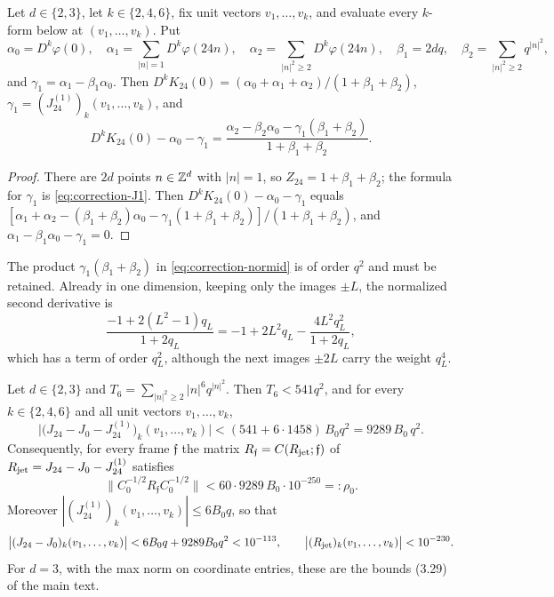 \begin{lemma}\label{lem:correction-normalization}
Let $d\in\{2,3\}$, let $k\in\{2,4,6\}$, fix unit vectors $v_1,\dots,v_k$, and evaluate every $k$-form below at $(v_1,\dots,v_k)$. Put
\[
\alpha_0=D^k\varphi(0),\quad \alpha_1=\sum_{|n|=1}D^k\varphi(24n),\quad \alpha_2=\sum_{|n|^2\ge2}D^k\varphi(24n),\quad \beta_1=2dq,\quad \beta_2=\sum_{|n|^2\ge2}q^{|n|^2},
\]
and $\gamma_1=\alpha_1-\beta_1\alpha_0$. Then $D^kK_{24}(0)=(\alpha_0+\alpha_1+\alpha_2)/(1+\beta_1+\beta_2)$, $\gamma_1=(J^{(1)}_{24})_k(v_1,\dots,v_k)$, and
\begin{equation}\label{eq:correction-normid}
D^kK_{24}(0)-\alpha_0-\gamma_1=\frac{\alpha_2-\beta_2\alpha_0-\gamma_1(\beta_1+\beta_2)}{1+\beta_1+\beta_2}.
\end{equation}
\end{lemma}

\begin{proof}
There are $2d$ points $n\in\mathbb Z^d$ with $|n|=1$, so $Z_{24}=1+\beta_1+\beta_2$; the formula for $\gamma_1$ is \eqref{eq:correction-J1}. Then $D^kK_{24}(0)-\alpha_0-\gamma_1$ equals $[\alpha_1+\alpha_2-(\beta_1+\beta_2)\alpha_0-\gamma_1(1+\beta_1+\beta_2)]/(1+\beta_1+\beta_2)$, and $\alpha_1-\beta_1\alpha_0-\gamma_1=0$.
\end{proof}

\begin{remark}\label{rem:correction-product}
The product $\gamma_1(\beta_1+\beta_2)$ in \eqref{eq:correction-normid} is of order $q^2$ and must be retained. Already in one dimension, keeping only the images $\pm L$, the normalized second derivative is
\[
\frac{-1+2(L^2-1)q_L}{1+2q_L}=-1+2L^2q_L-\frac{4L^2q_L^2}{1+2q_L},
\]
which has a term of order $q_L^2$, although the next images $\pm2L$ carry the weight $q_L^4$.
\end{remark}

\begin{lemma}\label{lem:correction-deep}
Let $d\in\{2,3\}$ and $T_6=\sum_{|n|^2\ge2}|n|^6q^{|n|^2}$. Then $T_6<541q^2$, and for every $k\in\{2,4,6\}$ and all unit vectors $v_1,\dots,v_k$,
\begin{equation}\label{eq:correction-deepjet}
\bigl|\bigl(J_{24}-J_0-J^{(1)}_{24}\bigr)_k(v_1,\dots,v_k)\bigr|<(541+6\cdot1458)\,B_0q^2=9289\,B_0\,q^2 .
\end{equation}
Consequently, for every frame $\mathfrak f$ the matrix $R_{\mathfrak f}=C(R_{\rm jet};\mathfrak f)$ of $R_{\rm jet}=J_{24}-J_0-J^{(1)}_{24}$ satisfies
\begin{equation}\label{eq:correction-rho}
\bigl\|C_0^{-1/2}R_{\mathfrak f}C_0^{-1/2}\bigr\|<60\cdot9289\,B_0\cdot10^{-250}=:\rho_0 .
\end{equation}
Moreover $|(J^{(1)}_{24})_k(v_1,\dots,v_k)|\le6B_0q$, so that
\[
\bigl|(J_{24}-J_0)_k(v_1,\dots,v_k)\bigr|<6B_0q+9289B_0q^2<10^{-113},\qquad\bigl|(R_{\rm jet})_k(v_1,\dots,v_k)\bigr|<10^{-230}.
\]
For $d=3$, with the max norm on coordinate entries, these are the bounds (3.29) of the main text.
\end{lemma}

